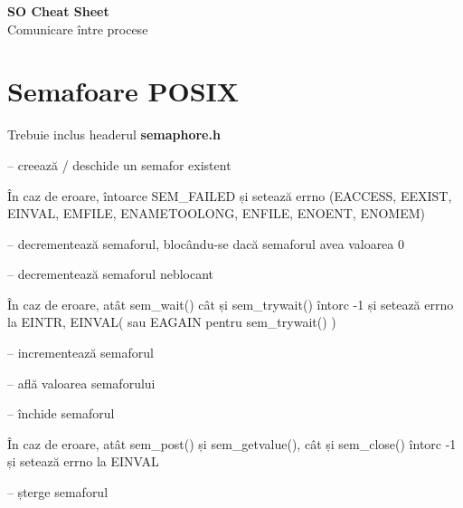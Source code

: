 \documentclass{refcard.cs.pub.ro}
\begin{document}
\raggedright
\footnotesize
\begin{multicols*}{3}

\setlength{\columnseprule}{0.25pt}
\setlength{\premulticols}{1pt}
\setlength{\postmulticols}{1pt}
\setlength{\multicolsep}{1pt}
\setlength{\columnsep}{2pt}

\begin{center}
     \Large{\textbf{SO Cheat Sheet}} \\
      {Comunicare între procese}\\
\end{center}

\section{ Semafoare POSIX}

Trebuie inclus headerul \textbf{semaphore.h}

 -- creează / deschide un semafor existent
\begin{params}
  \param{}{}
\end{params}

În caz de eroare, întoarce SEM_FAILED și setează errno
(EACCESS, EEXIST, EINVAL, EMFILE, ENAMETOOLONG, ENFILE, ENOENT, ENOMEM)

 -- decrementează semaforul, blocându-se dacă semaforul avea valoarea 0


 --  decrementează semaforul neblocant

În caz de eroare, atât sem_wait() cât și sem_trywait() întorc -1 și setează errno la EINTR, EINVAL( sau EAGAIN pentru sem_trywait() )

 -- incrementează semaforul

 -- află valoarea semaforului

 -- închide semaforul

În caz de eroare, atât sem_post() și sem_getvalue(), cât și sem_close() întorc -1 și setează errno la EINVAL

 -- șterge semaforul


\end{multicols*}
\end{document}
